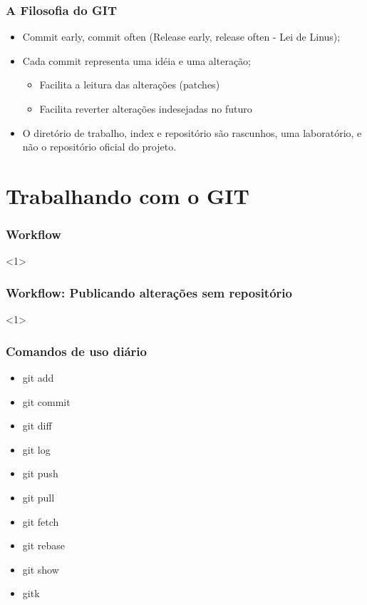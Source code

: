 \documentclass{beamer}
\begin{document}
\begin{frame}
\frametitle{A Filosofia do GIT}
\begin{itemize}
\item Commit early, commit often (Release early, release often - Lei de Linus);
\item Cada commit representa uma idéia e uma alteração;
\begin{itemize}
\item Facilita a leitura das alterações (patches)
\item Facilita reverter alterações indesejadas no futuro
\end{itemize}
\item O diretório de trabalho, index e repositório são rascunhos, uma laboratório, e não o repositório oficial do projeto.
\end{itemize}
\end{frame}

\section{Trabalhando com o GIT}
\begin{frame}
\frametitle{Workflow}

<1>

\end{frame}

\begin{frame}
\frametitle{Workflow: Publicando alterações sem repositório}

<1>

\end{frame}

\begin{frame}
\frametitle{Comandos de uso diário}


\begin{itemize}
\item git add
\item git commit
\item git diff
\item git log
\item git push
\item git pull
\item git fetch
\item git rebase
\item git show
\item gitk
\end{itemize}


\end{frame}
\end{document}
